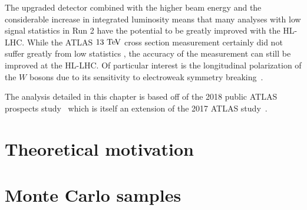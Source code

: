 The upgraded detector combined with the higher beam energy and the considerable increase in integrated luminosity means that many analyses with low signal statistics in Run 2 have the potential to be greatly improved with the HL-LHC.
While the ATLAS $13\tev$ \ssww cross section measurement certainly did not suffer greatly from low statistics , the accuracy of the measurement can still be improved at the HL-LHC. %
Of particular interest is the longitudinal polarization of the $W$ bosons due to its sensitivity to electroweak symmetry breaking~\cite{2013.longitudinal-theory}.%

The analysis detailed in this chapter is based off of the 2018 public ATLAS \ssww prospects study~\cite{2018.ssww-upgrade} which is itself an extension of the 2017 ATLAS study~\cite{2017.ssww-upgrade}.  




%

\section{Theoretical motivation}\label{sswwupgrade:theory}


\section{Monte Carlo samples}\label{sswwupgrade:mc}


%

